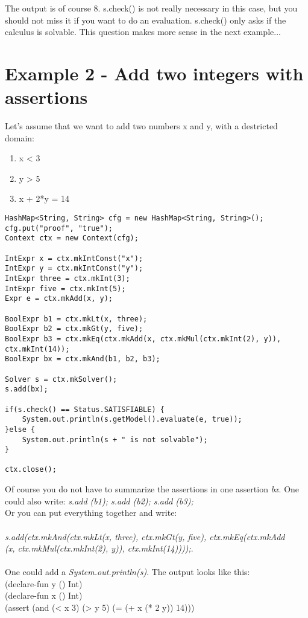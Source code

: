 The output is of course 8.
s.check() is not really necessary in this case, but you should not miss it if you want to do an evaluation. 
s.check() only asks if the calculus is solvable. 
This question makes more sense in the next example...


\section{Example 2 - Add two integers with assertions}

Let's assume that we want to add two numbers x and y, with a destricted domain:
\begin{enumerate}
\item x < 3	
\item y > 5	
\item x + 2*y = 14 
\end{enumerate}

\begin{lstlisting}[frame=single]
HashMap<String, String> cfg = new HashMap<String, String>();
cfg.put("proof", "true");
Context ctx = new Context(cfg);

IntExpr x = ctx.mkIntConst("x");
IntExpr y = ctx.mkIntConst("y");
IntExpr three = ctx.mkInt(3);
IntExpr five = ctx.mkInt(5);
Expr e = ctx.mkAdd(x, y);
		
BoolExpr b1 = ctx.mkLt(x, three);
BoolExpr b2 = ctx.mkGt(y, five);
BoolExpr b3 = ctx.mkEq(ctx.mkAdd(x, ctx.mkMul(ctx.mkInt(2), y)), ctx.mkInt(14));
BoolExpr bx = ctx.mkAnd(b1, b2, b3);
		
Solver s = ctx.mkSolver();
s.add(bx);
	
if(s.check() == Status.SATISFIABLE) {
	System.out.println(s.getModel().evaluate(e, true));
}else {
	System.out.println(s + " is not solvable");
}

ctx.close();
\end{lstlisting}
Of course you do not have to summarize the assertions in one assertion \textit{bx}. One could also write: \textit{s.add (b1); s.add (b2); s.add (b3);}\\
Or you can put everything together and write:\\\\
\textit{	s.add(ctx.mkAnd(ctx.mkLt(x, three), ctx.mkGt(y, five), ctx.mkEq(ctx.mkAdd\\
(x, ctx.mkMul(ctx.mkInt(2), y)), ctx.mkInt(14))));}.\\\\
One could add a \textit{System.out.println(s)}.
The output looks like this:\\
(declare-fun y () Int)\\
(declare-fun x () Int)\\
(assert (and (< x 3) (> y 5) (= (+ x (* 2 y)) 14)))\\


